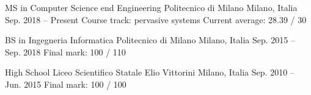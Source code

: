 

\begin{cventries}

\cventry
    {MS in Computer Science end Engineering}
    {Politecnico di Milano}
    {Milano, Italia}
    {Sep. 2018 -- Present}
    {Course track: pervasive systems {\enskip\cdotp\enskip} Current average: 28.39 / 30}
    
\cventry
    {BS in Ingegneria Informatica}
    {Politecnico di Milano}
    {Milano, Italia}
    {Sep. 2015 -- Sep. 2018}
    {Final mark: 100 / 110}
    
\cventry
    {High School}
    {Liceo Scientifico Statale Elio Vittorini}
    {Milano, Italia}
    {Sep. 2010 -- Jun. 2015}
    {Final mark: 100 / 100}
\end{cventries}

